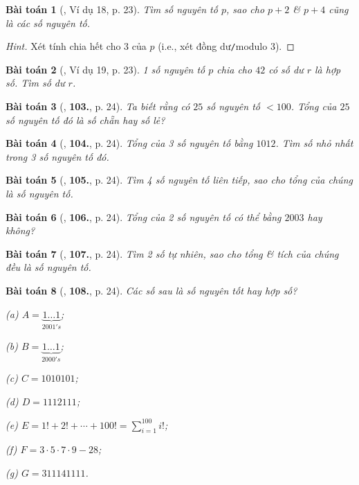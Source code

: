 \documentclass[oneside]{book}
\numberwithin{equation}{section}
\newtheorem{baitoan}{Bài toán}[section]
\begin{document}
\begin{baitoan}[\cite{Binh_Toan_6_tap_1}, Ví dụ 18, p. 23]
	Tìm số nguyên tố $p$, sao cho $p + 2$ \& $p + 4$ cũng là các số nguyên tố.
\end{baitoan}

\begin{proof}[Hint]
	Xét tính chia hết cho $3$ của $p$ (i.e., xét đồng dư\texttt{/}modulo $3$).
\end{proof}

\begin{baitoan}[\cite{Binh_Toan_6_tap_1}, Ví dụ 19, p. 23]
	1 số nguyên tố $p$ chia cho $42$ có số dư $r$ là hợp số. Tìm số dư $r$.
\end{baitoan}

\begin{baitoan}[\cite{Binh_Toan_6_tap_1}, \textbf{103.}, p. 24]
	Ta biết rằng có $25$ số nguyên tố $< 100$. Tổng của $25$ số nguyên tố đó là số chẵn hay số lẻ?
\end{baitoan}

\begin{baitoan}[\cite{Binh_Toan_6_tap_1}, \textbf{104.}, p. 24]
	Tổng của 3 số nguyên tố bằng $1012$. Tìm số nhỏ nhất trong 3 số nguyên tố đó.
\end{baitoan}

\begin{baitoan}[\cite{Binh_Toan_6_tap_1}, \textbf{105.}, p. 24]
	Tìm 4 số nguyên tố liên tiếp, sao cho tổng của chúng là số nguyên tố.
\end{baitoan}

\begin{baitoan}[\cite{Binh_Toan_6_tap_1}, \textbf{106.}, p. 24]
	Tổng của 2 số nguyên tố có thể bằng $2003$ hay không?
\end{baitoan}

\begin{baitoan}[\cite{Binh_Toan_6_tap_1}, \textbf{107.}, p. 24]
	Tìm 2 số tự nhiên, sao cho tổng \& tích của chúng đều là số nguyên tố.
\end{baitoan}

\begin{baitoan}[\cite{Binh_Toan_6_tap_1}, \textbf{108.}, p. 24]
	Các số sau là số nguyên tốt hay hợp số?
	\begin{enumerate*}
		\item[(a)] $A = \underbrace{1\ldots 1}_{2001's}$;
		\item[(b)] $B = \underbrace{1\ldots 1}_{2000's}$;
		\item[(c)] $C = 1010101$;
		\item[(d)] $D = 1112111$;
		\item[(e)] $E = 1! + 2! + \cdots + 100! = \sum_{i=1}^{100} i!$;
		\item[(f)] $F = 3\cdot 5\cdot 7\cdot 9 - 28$;
		\item[(g)] $G = 311141111$.
	\end{enumerate*}
\end{baitoan}
\end{document}
